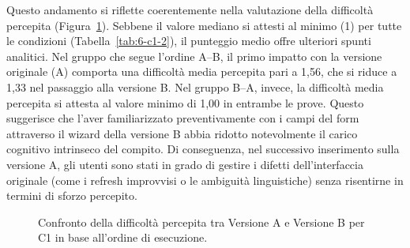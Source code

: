 Questo andamento si riflette coerentemente nella valutazione della difficoltà percepita (Figura~\ref{fig:6-c1-2}). Sebbene il valore mediano si attesti al minimo (1) per tutte le condizioni (Tabella~\ref{tab:6-c1-2}), il punteggio medio offre ulteriori spunti analitici. Nel gruppo che segue l'ordine A--B, il primo impatto con la versione originale (A) comporta una difficoltà media percepita pari a 1,56, che si riduce a 1,33 nel passaggio alla versione B. Nel gruppo B--A, invece, la difficoltà media percepita si attesta al valore minimo di 1,00 in entrambe le prove. Questo suggerisce che l'aver familiarizzato preventivamente con i campi del form attraverso il wizard della versione B abbia ridotto notevolmente il carico cognitivo intrinseco del compito. Di conseguenza, nel successivo inserimento sulla versione A, gli utenti sono stati in grado di gestire i difetti dell'interfaccia originale (come i refresh improvvisi o le ambiguità linguistiche) senza risentirne in termini di sforzo percepito.

\begin{figure}[H]
	\centering
	\caption{Confronto della difficoltà percepita tra Versione A e Versione B per C1 in base all'ordine di esecuzione.}
	\label{fig:6-c1-2}
\end{figure}
